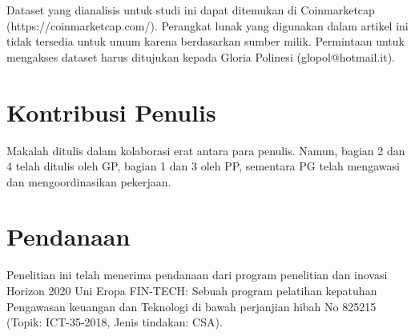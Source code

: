 \documentclass[12pt,a4paper]{article}
\begin{document}
Dataset yang dianalisis untuk studi ini dapat ditemukan di Coinmarketcap (https://coinmarketcap.com/). Perangkat lunak yang digunakan dalam artikel ini tidak tersedia untuk umum karena berdasarkan sumber milik. Permintaan untuk mengakses dataset harus ditujukan kepada Gloria Polinesi (glopol@hotmail.it).

\section*{Kontribusi Penulis}

Makalah ditulis dalam kolaborasi erat antara para penulis. Namun, bagian 2 dan 4 telah ditulis oleh GP, bagian 1 dan 3 oleh PP, sementara PG telah mengawasi dan mengoordinasikan pekerjaan.

\section*{Pendanaan}

Penelitian ini telah menerima pendanaan dari program penelitian dan inovasi Horizon 2020 Uni Eropa FIN-TECH: Sebuah program pelatihan kepatuhan Pengawasan keuangan dan Teknologi di bawah perjanjian hibah No 825215 (Topik: ICT-35-2018, Jenis tindakan: CSA).
\end{document}
